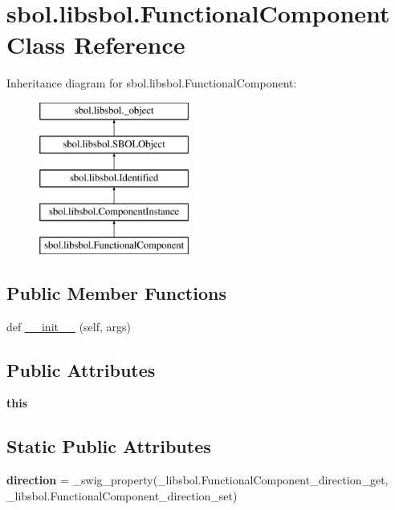 \hypertarget{classsbol_1_1libsbol_1_1_functional_component}{}\section{sbol.\+libsbol.\+Functional\+Component Class Reference}
\label{classsbol_1_1libsbol_1_1_functional_component}
Inheritance diagram for sbol.\+libsbol.\+Functional\+Component\+:\begin{figure}[H]
\begin{center}
\leavevmode
\includegraphics[height=5.000000cm]{classsbol_1_1libsbol_1_1_functional_component}
\end{center}
\end{figure}
\subsection*{Public Member Functions}
\begin{DoxyCompactItemize}
\item 
def \hyperlink{classsbol_1_1libsbol_1_1_functional_component_a8d77872e0dc59dc4de54f88ab09d6cb3}{\+\_\+\+\_\+init\+\_\+\+\_\+} (self, args)
\end{DoxyCompactItemize}
\subsection*{Public Attributes}
\begin{DoxyCompactItemize}
\item 
{\bfseries this}\hypertarget{classsbol_1_1libsbol_1_1_functional_component_af54267278905312669110963b9bf0a99}{}\label{classsbol_1_1libsbol_1_1_functional_component_af54267278905312669110963b9bf0a99}

\end{DoxyCompactItemize}
\subsection*{Static Public Attributes}
\begin{DoxyCompactItemize}
\item 
{\bfseries direction} = \+\_\+swig\+\_\+property(\+\_\+libsbol.\+Functional\+Component\+\_\+direction\+\_\+get, \+\_\+libsbol.\+Functional\+Component\+\_\+direction\+\_\+set)\hypertarget{classsbol_1_1libsbol_1_1_functional_component_a2b9f016242b2ef44ab32b604df86d179}{}\label{classsbol_1_1libsbol_1_1_functional_component_a2b9f016242b2ef44ab32b604df86d179}

\end{DoxyCompactItemize}


